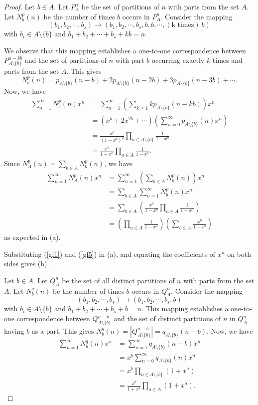 \documentclass[11pt]{article}
\begin{document}
\begin{proof}
Let $b\in A$. Let $P_A^n$ be the set of partitions of $n$ with parts from the set $A$. Let $N_b^p(n)$ be the number of times $b$ occurs in $P_A^n$. Consider the mapping
\[(b_1,b_2,\cdots ,b_s)\to (b_1,b_2,\cdots ,b_s,b,b,\cdots ,(\text{k times})\ b)
\]
with $b_i\in A\setminus\{b\}$ and $b_1+b_2+\cdots +b_s+kb=n$.

We observe that this mapping establishes a one-to-one correspondence between $P_{A\setminus\{b\}}^{n-kb}$ and the set of partitions of $n$ with  part $b$ occurring exactly $k$ times and parts from the set $A$. This gives \[N_b^p(n)=p_{A\setminus\{b\}}(n-b)+2p_{A\setminus\{b\}}(n-2b)+3p_{A\setminus\{b\}}(n-3b)+\cdots.\]
Now, we have 
\begin{align*}
\sum_{n=1}^{\infty}N_b^p(n)x^n&=\sum_{n=1}^{\infty}\left(\sum_{k\geq 1}kp_{A\setminus\{b\}}(n-kb)\right)x^n\\ &=(x^b+2x^{2b}+\cdots)\left(\sum_{n=0}^{\infty}p_{A\setminus\{b\}}(n)x^n\right)\\
&=\frac{x^b}{(1-x^b)^2}\prod_{a\in A\setminus\{b\}}\frac{1}{1-x^a}\\
&=\frac{x^b}{1-x^b}\prod_{a\in A}\frac{1}{1-x^a}.
\end{align*}
Since $N_A^p(n)=\sum_{b\in A}N_b^p(n)$, we have
\begin{align*}
\sum_{n=1}^{\infty}N^p_A(n)x^n&=\sum_{n=1}^{\infty}\left(\sum_{b\in A}N_b^p(n)\right)x^n\\ &=\sum_{b\in A}\sum_{n=1}^{\infty} N_b^p(n)x^n\\ &=\sum_{b\in A}\left(\frac{x^b}{1-x^b}\prod_{a\in A}\frac{1}{1-x^a}\right)\\ &=\left(\prod_{a\in A}\frac{1}{1-x^a}\right)\left(\sum_{b\in A}\frac{x^b}{1-x^b}\right)
\end{align*}
as expected in (a).

Substituting (\ref{gf1}) and (\ref{gf5}) in (a), and equating the coefficients of $x^n$ on both sides gives (b).

Let $b\in A$. Let $Q_A^n$ be the set of all distinct partitions of $n$ with parts from the set $A$. Let $N_b^q(n)$ be the number of times $b$ occurs in $Q_A^n$. Consider the mapping
\[(b_1,b_2,\cdots,b_s)\to (b_1,b_2,\cdots ,b_s,b)
\]
with $b_i\in A\setminus \{b\}$ and $b_1+b_2+\cdots +b_s+b=n$. This mapping establishes a one-to-one correspondence between $Q_{A\setminus\{b\}}^{n-b}$ and the set of distinct partitions of $n$ in $Q_{A}^n$ having $b$ as a part. This gives $N_b^q(n)=|Q_{A\setminus\{b\}}^{n-b}|=q_{A\setminus \{b\}}(n-b)$. Now, we have
\begin{align*}
\sum_{n=1}^{\infty}N_b^q(n)x^n&=\sum_{n=1}^{\infty}q_{A\setminus\{b\}}(n-b)x^n
\\&=x^b\sum_{n=0}^{\infty}q_{A\setminus\{b\}}(n)x^n\\
\
&=x^b\prod_{a\in A\setminus\{b\}}(1+x^a) \\
&=\frac{x^b}{1+x^b}\prod_{a\in A}(1+x^a).
\end{align*}


\end{proof}
\end{document}
